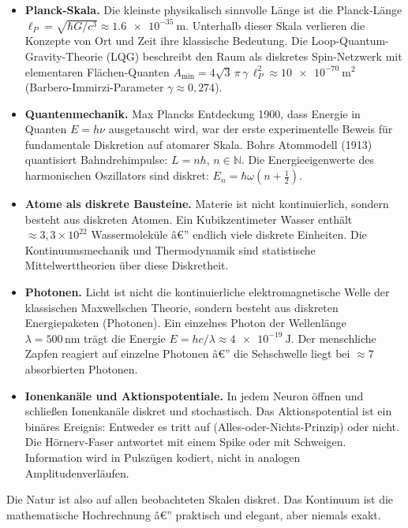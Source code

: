 ﻿\documentclass[12pt,a4paper,titlepage]{report}
\begin{document}
\begin{itemize}[leftmargin=2em]
	\item \textbf{Planck-Skala.}
		Die kleinste physikalisch sinnvolle Länge ist die Planck-Länge
		$\ell_P = \sqrt{\hbar G / c^3} \approx \SI{1.6e-35}{\metre}$.
		Unterhalb dieser Skala verlieren die Konzepte von Ort und Zeit
		ihre klassische Bedeutung.
		Die Loop-Quantum-Gravity-Theorie (LQG) beschreibt den Raum
		als diskretes Spin-Netzwerk mit elementaren Flächen-Quanten
		$A_{\min} = 4\sqrt{3}\,\pi\,\gamma\,\ell_P^2 \approx
		\SI{10e-70}{\metre\squared}$ (Barbero-Immirzi-Parameter $\gamma\approx0{,}274$).
	\item \textbf{Quantenmechanik.}
		Max Plancks Entdeckung 1900, dass Energie in Quanten
		$E = h\nu$ ausgetauscht wird, war der erste experimentelle Beweis
		für fundamentale Diskretion auf atomarer Skala.
		Bohrs Atommodell (1913) quantisiert Bahndrehimpulse:
		$L = n\hbar$, $n \in \mathbb{N}$.
		Die Energieeigenwerte des harmonischen Oszillators sind diskret:
		$E_n = \hbar\omega(n + \tfrac{1}{2})$.
	\item \textbf{Atome als diskrete Bausteine.}
		Materie ist nicht kontinuierlich, sondern besteht aus diskreten
		Atomen.
		Ein Kubikzentimeter Wasser enthält $\approx 3{,}3\times10^{22}$
		Wassermoleküle â€” endlich viele diskrete Einheiten.
		Die Kontinuumsmechanik und Thermodynamik sind statistische
		Mittelwerttheorien über diese Diskretheit.
	\item \textbf{Photonen.}
		Licht ist nicht die kontinuierliche elektromagnetische Welle
		der klassischen Maxwellschen Theorie, sondern besteht aus
		diskreten Energiepaketen (Photonen).
		Ein einzelnes Photon der Wellenlänge $\lambda=500\,\mathrm{nm}$
		trägt die Energie $E = hc/\lambda \approx \SI{4e-19}{\joule}$.
		Der menschliche Zapfen reagiert auf einzelne Photonen â€”
		die Sehschwelle liegt bei $\approx 7$ absorbierten Photonen.
	\item \textbf{Ionenkanäle und Aktionspotentiale.}
		In jedem Neuron öffnen und schließen Ionenkanäle diskret
		und stochastisch.
		Das Aktionspotential ist ein binäres Ereignis: Entweder es
		tritt auf (Alles-oder-Nichts-Prinzip) oder nicht.
		Die Hörnerv-Faser antwortet mit einem Spike oder mit Schweigen.
		Information wird in Pulszügen kodiert, nicht in analogen
		Amplitudenverläufen.
\end{itemize}

Die Natur ist also auf allen beobachteten Skalen diskret.
Das Kontinuum ist die mathematische Hochrechnung â€”
praktisch und elegant, aber niemals exakt.
\end{document}
